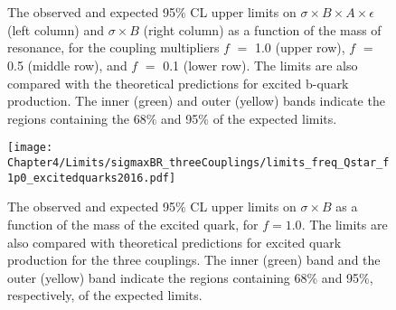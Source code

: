 \begin{figure}[]
  \begin{center}
    \\ \vspace{-0.25in}
    \\ \vspace{-0.25in}
    \caption{The observed and expected 95$\%$ CL upper limits on $\sigma\times{B}\times{A}\times\epsilon$ (left column) and $\sigma\times{B}$ (right column) as a function
      of the mass of \bstar resonance, for the coupling multipliers $f$ $=$ 1.0 (upper row), $f$ $=$ 0.5 (middle row), and $f$ $=$ 0.1 (lower row). The limits are
      also compared with the theoretical predictions for excited b-quark production. The inner (green) and outer (yellow) bands indicate the regions containing the 68$\%$
      and 95$\%$ of the expected limits.} 
    \label{fig:bstarlimit}
  \end{center}
\end{figure}

\begin{figure}[htbp]
\centering
\texttt{[image: Chapter4/Limits/sigmaxBR\_threeCouplings/limits\_freq\_Qstar\_f1p0\_excitedquarks2016.pdf]}
 \caption{The observed and expected 95$\%$ CL upper limits on $\sigma\times{B}$ as a function of the mass of the excited quark, for $f = 1.0$. 
 The limits are also compared with theoretical predictions for excited quark production for the three couplings. The inner (green) band and the
outer (yellow) band indicate the regions containing 68$\%$ and 95$\%$, respectively, of the expected limits.}
\label{fig:qstarlimit_allcoup}
\end{figure}

